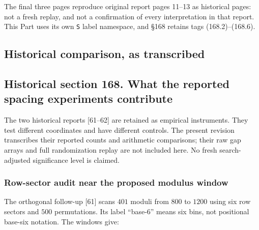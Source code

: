 \documentclass[
  11pt,
]{book}
\begin{document}
The final three pages reproduce original report pages 11--13 as
historical pages: not a fresh replay, and not a confirmation of every
interpretation in that report. This Part uses its own \texttt{S} label
namespace, and §168 retains tags (168.2)--(168.6).

\subsection{Historical comparison, as
transcribed}\label{historical-comparison-as-transcribed}

\subsection{Historical section 168. What the reported spacing
experiments
contribute}\label{historical-section-168.-what-the-reported-spacing-experiments-contribute}

The two historical reports {[}61--62{]} are retained as empirical
instruments. They test different coordinates and have different
controls. The present revision transcribes their reported counts and
arithmetic comparisons; their raw gap arrays and full randomization
replay are not included here. No fresh search-adjusted significance
level is claimed.

\subsubsection{Row-sector audit near the proposed modulus
window}\label{row-sector-audit-near-the-proposed-modulus-window}

The orthogonal follow-up {[}61{]} scans \(401\) moduli from \(800\) to
\(1200\) using six row sectors and \(500\) permutations. Its label
``base-6'' means six bins, not positional base-six notation. The windows
give:
\end{document}
